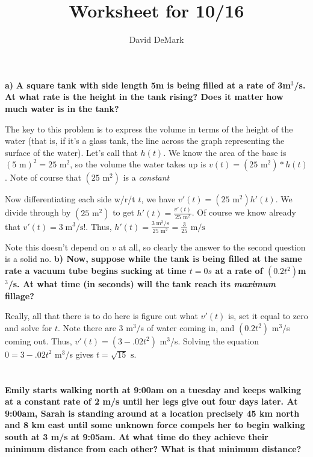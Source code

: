 \documentclass[english]{article}
\title{Worksheet for 10/16}
\author{David DeMark}
\date{\due}
\newcommand{\ms}{\text{ m/s}}
\newcommand{\ml}{\text{ m}}
\newcommand{\msa}{\text{ m}^2}
\newcommand{\st}{\text{ s}}
\newcommand{\prob}[1]{\setcounter{section}{#1-1}\section{}}
\theoremstyle{remark}
\theoremstyle{definition}
\begin{document}
\prob{1} {{\textbf{a)}}} \textbf{A square tank with side length 5m is being filled at a rate of 3m${}^3$/s. At what rate is the height in the tank rising? Does it matter how much water is in the tank? }

The key to this problem is to express the volume in terms of the height of the water (that is, if it's a glass tank, the line across the graph representing the surface of the water). Let's call that $h(t)$. We know the area of the base is $(5\ml)^2=25\msa$, so the volume the water takes up is $v(t)=(25\msa)*h(t)$. Note of course that $(25\msa)$ is a \emph{constant\textellipsis} 

Now differentiating each side w/r/t $t$, we have $v'(t)=(25\msa)h'(t)$. We divide through by $(25\msa)$ to get $h'(t)=\frac{v'(t)}{25\msa}$. Of course we know already that $v'(t)=3\;\text{m}^3/\text{s}$!. Thus, $h'(t)=\frac{3\;\text{m}^3/\text{s}}{25\msa}=\frac{3}{25}\ms$

Note this doesn't depend on $v$ at all, so clearly the answer to the second question is a solid no.
\vskip15mm
\textbf{b) Now, suppose while the tank is being filled at the same rate a vacuum tube begins sucking at time $t=0s$ at a rate of $(0.2t^2)$m${}^3$/s. At what time (in seconds) will the tank reach its \emph{maximum} fillage?} 

Really, all that there is to do here is figure out what $v'(t)$ is, set it equal to zero and solve for $t$. Note there are 3 m${}^3/$s of water coming in, and $(0.2t^2)$ m${}^3/$s coming out. Thus, $v'(t)=(3-.02t^2)$ m${}^3$/s. Solving the equation $0 =3-.02t^2$ m${}^3$/s gives $t=\sqrt{15}\st$.\vskip15mm 
\prob{2}
\textbf{Emily starts walking north at 9:00am on a tuesday and keeps walking at a constant rate of 2 m/s until her legs give out four days later. At 9:00am, Sarah is standing around at a location precisely 45 km north and 8 km east until some unknown force compels her to begin walking south at 3 m/s at 9:05am. At what time do they achieve their minimum distance from each other? What is that minimum distance?}
\end{document}
